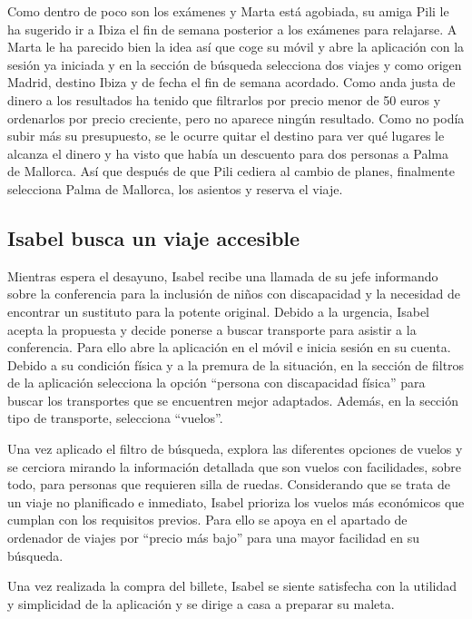 Como dentro de poco son los exámenes y Marta está agobiada, su amiga Pili le ha sugerido ir a Ibiza el fin de semana posterior a los exámenes para relajarse. A Marta le ha parecido bien la idea así que coge su móvil y abre la aplicación con la sesión ya iniciada y en la sección de búsqueda selecciona dos viajes y como origen Madrid, destino Ibiza y de fecha el fin de semana acordado. Como anda justa de dinero a los resultados ha tenido que filtrarlos por precio menor de 50 euros y ordenarlos por precio creciente, pero no aparece ningún resultado. Como no podía subir más su presupuesto, se le ocurre quitar el destino para ver qué lugares le alcanza el dinero y ha visto que había un descuento para dos personas a Palma de Mallorca. Así que  después de que Pili cediera al cambio de planes, finalmente selecciona Palma de Mallorca, los asientos y reserva el viaje.

\subsection{Isabel busca un viaje accesible}

Mientras espera el desayuno, Isabel recibe una llamada de su jefe informando sobre la conferencia para la inclusión de niños con discapacidad y la necesidad de encontrar un sustituto para la potente original. Debido a la urgencia, Isabel acepta la propuesta y decide ponerse a buscar transporte para asistir a la conferencia. Para ello abre la aplicación en el móvil e inicia sesión en su cuenta. Debido a su condición física y a la premura de la situación, en la sección de filtros de la aplicación selecciona la opción “persona con discapacidad física” para buscar los transportes que se encuentren mejor adaptados. Además, en la sección tipo de transporte, selecciona “vuelos”.

Una vez aplicado el filtro de búsqueda, explora las diferentes opciones de vuelos y se cerciora mirando la información detallada que son vuelos con facilidades, sobre todo, para personas que requieren silla de ruedas.
Considerando que se trata de un viaje no planificado e inmediato, Isabel prioriza los vuelos más económicos que cumplan con los requisitos previos. Para ello se apoya en el apartado de  ordenador de viajes por “precio más bajo” para una mayor facilidad en su búsqueda.

Una vez realizada la compra del billete, Isabel se siente satisfecha con la utilidad y simplicidad de la aplicación y se dirige a casa a preparar su maleta.

